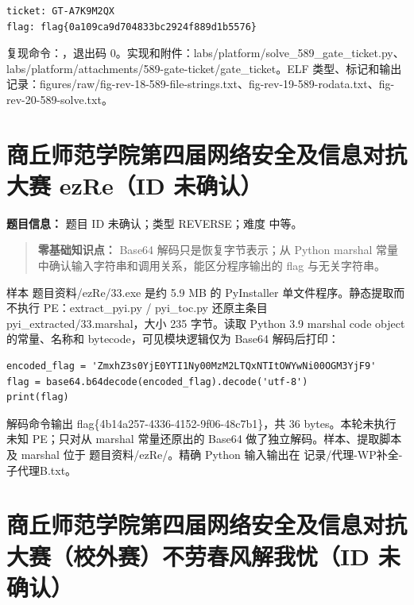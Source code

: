 \begin{verbatim}
ticket: GT-A7K9M2QX
flag: flag{0a109ca9d704833bc2924f889d1b5576}
\end{verbatim}

复现命令：\texttt{}，退出码 0。实现和附件：labs/platform/solve\_589\_gate\_ticket.py、labs/platform/attachments/589-gate-ticket/gate\_ticket。ELF 类型、标记和输出记录：figures/raw/fig-rev-18-589-file-strings.txt、fig-rev-19-589-rodata.txt、fig-rev-20-589-solve.txt。

\section{商丘师范学院第四届网络安全及信息对抗大赛 ezRe（ID 未确认）}\label{ux5546ux4e18ux5e08ux8303ux5b66ux9662ux7b2cux56dbux5c4aux7f51ux7edcux5b89ux5168ux53caux4fe1ux606fux5bf9ux6297ux5927ux8d5b-ezreid-ux672aux786eux8ba4}

\textbf{题目信息：} 题目 ID 未确认；类型 REVERSE；难度 中等。

\begin{quote}
\textbf{零基础知识点：} Base64 解码只是恢复字节表示；从 Python marshal 常量中确认输入字符串和调用关系，能区分程序输出的 flag 与无关字符串。
\end{quote}

样本 题目资料/ezRe/33.exe 是约 5.9 MB 的 PyInstaller 单文件程序。静态提取而不执行 PE：extract\_pyi.py / pyi\_toc.py 还原主条目 pyi\_extracted/33.marshal，大小 235 字节。读取 Python 3.9 marshal code object 的常量、名称和 bytecode，可见模块逻辑仅为 Base64 解码后打印：

\begin{verbatim}
encoded_flag = 'ZmxhZ3s0YjE0YTI1Ny00MzM2LTQxNTItOWYwNi00OGM3YjF9'
flag = base64.b64decode(encoded_flag).decode('utf-8')
print(flag)
\end{verbatim}

解码命令输出 flag\{4b14a257-4336-4152-9f06-48c7b1\}，共 36 bytes。本轮未执行未知 PE；只对从 marshal 常量还原出的 Base64 做了独立解码。样本、提取脚本及 marshal 位于 题目资料/ezRe/。精确 Python 输入输出在 记录/代理-WP补全-子代理B.txt。

\section{商丘师范学院第四届网络安全及信息对抗大赛（校外赛）不劳春风解我忧（ID 未确认）}\label{ux5546ux4e18ux5e08ux8303ux5b66ux9662ux7b2cux56dbux5c4aux7f51ux7edcux5b89ux5168ux53caux4fe1ux606fux5bf9ux6297ux5927ux8d5bux6821ux5916ux8d5bux4e0dux52b3ux6625ux98ceux89e3ux6211ux5fe7id-ux672aux786eux8ba4}

